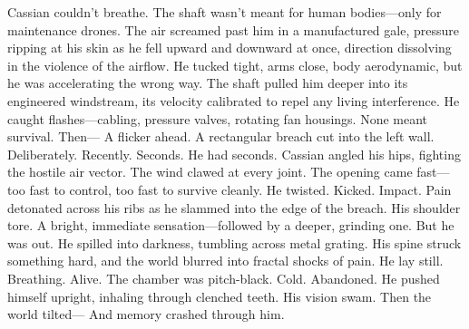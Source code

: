 \documentclass[12pt,oneside]{book}
\begin{document}
Cassian couldn’t breathe.
The shaft wasn’t meant for human bodies—only for maintenance drones. The air screamed past him in a manufactured gale, pressure ripping at his skin as he fell upward and downward at once, direction dissolving in the violence of the airflow.
He tucked tight, arms close, body aerodynamic, but he was accelerating the wrong way. The shaft pulled him deeper into its engineered windstream, its velocity calibrated to repel any living interference.
He caught flashes—cabling, pressure valves, rotating fan housings. None meant survival.
Then—
A flicker ahead.
A rectangular breach cut into the left wall. Deliberately. Recently.
Seconds. He had seconds.
Cassian angled his hips, fighting the hostile air vector. The wind clawed at every joint. The opening came fast—too fast to control, too fast to survive cleanly.
He twisted.
Kicked.
Impact.
Pain detonated across his ribs as he slammed into the edge of the breach. His shoulder tore. A bright, immediate sensation—followed by a deeper, grinding one.
But he was out.
He spilled into darkness, tumbling across metal grating. His spine struck something hard, and the world blurred into fractal shocks of pain.
He lay still.
Breathing.
Alive.
The chamber was pitch-black. Cold. Abandoned. He pushed himself upright, inhaling through clenched teeth. His vision swam.
Then the world tilted—
And memory crashed through him.
\end{document}
